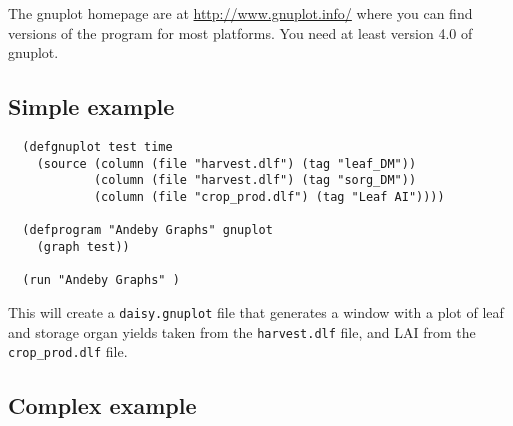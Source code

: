 \documentclass[a4paper]{article}
\begin{document}
The gnuplot homepage are at \url{http://www.gnuplot.info/} where you
can find versions of the program for most platforms.  You need at
least version 4.0 of gnuplot.

\subsection{Simple example}

\begin{verbatim}
  (defgnuplot test time
    (source (column (file "harvest.dlf") (tag "leaf_DM"))
            (column (file "harvest.dlf") (tag "sorg_DM"))
            (column (file "crop_prod.dlf") (tag "Leaf AI"))))

  (defprogram "Andeby Graphs" gnuplot
    (graph test))

  (run "Andeby Graphs" )
\end{verbatim}
This will create a \texttt{daisy.gnuplot} file that generates a window
with a plot of leaf and storage organ yields taken from the
\texttt{harvest.dlf} file, and LAI from the \texttt{crop\_prod.dlf}
file.

\subsection{Complex example}
\end{document}

